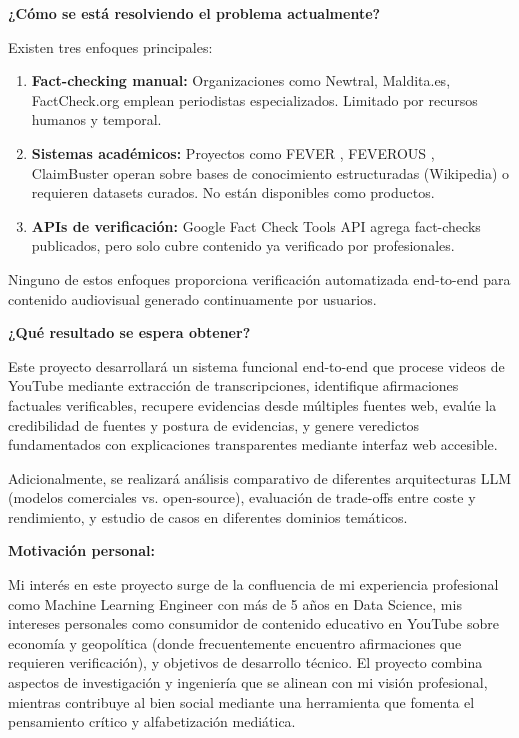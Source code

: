 \documentclass[12pt,a4paper,twoside]{book}
\begin{document}
\textbf{¿Cómo se está resolviendo el problema actualmente?}

Existen tres enfoques principales:

\begin{enumerate}
    \item \textbf{Fact-checking manual:} Organizaciones como Newtral, Maldita.es, FactCheck.org emplean periodistas especializados. Limitado por recursos humanos y temporal.
    \item \textbf{Sistemas académicos:} Proyectos como FEVER \citep{thorne2018fever}, FEVEROUS \citep{aly2021feverous}, ClaimBuster operan sobre bases de conocimiento estructuradas (Wikipedia) o requieren datasets curados. No están disponibles como productos.
    \item \textbf{APIs de verificación:} Google Fact Check Tools API agrega fact-checks publicados, pero solo cubre contenido ya verificado por profesionales.
\end{enumerate}

Ninguno de estos enfoques proporciona verificación automatizada end-to-end para contenido audiovisual generado continuamente por usuarios.

\textbf{¿Qué resultado se espera obtener?}

Este proyecto desarrollará un sistema funcional end-to-end que procese videos de YouTube mediante extracción de transcripciones, identifique afirmaciones factuales verificables, recupere evidencias desde múltiples fuentes web, evalúe la credibilidad de fuentes y postura de evidencias, y genere veredictos fundamentados con explicaciones transparentes mediante interfaz web accesible.

Adicionalmente, se realizará análisis comparativo de diferentes arquitecturas LLM (modelos comerciales vs. open-source), evaluación de trade-offs entre coste y rendimiento, y estudio de casos en diferentes dominios temáticos.

\textbf{Motivación personal:}

Mi interés en este proyecto surge de la confluencia de mi experiencia profesional como Machine Learning Engineer con más de 5 años en Data Science, mis intereses personales como consumidor de contenido educativo en YouTube sobre economía y geopolítica (donde frecuentemente encuentro afirmaciones que requieren verificación), y objetivos de desarrollo técnico. El proyecto combina aspectos de investigación y ingeniería que se alinean con mi visión profesional, mientras contribuye al bien social mediante una herramienta que fomenta el pensamiento crítico y alfabetización mediática.
\end{document}
